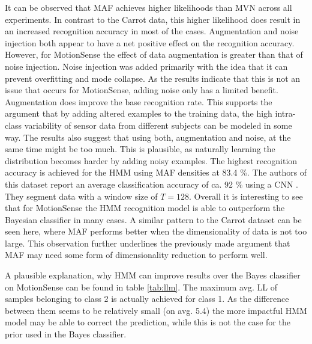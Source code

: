 \documentclass[11pt,titlepage,oneside,openany]{book}
\begin{document}
\noindent It can be observed that MAF achieves higher likelihoods than MVN across all experiments. In contrast to the Carrot data, this higher likelihood does result in an increased recognition accuracy in most of the cases. Augmentation and noise injection both appear to have a net positive effect on the recognition accuracy. However, for MotionSense the effect of data augmentation is greater than that of noise injection. Noise injection was added primarily with the idea that it can prevent overfitting and mode collapse. As the results indicate that this is not an issue that occurs for MotionSense, adding noise only has a limited benefit. Augmentation does improve the base recognition rate. This supports the argument that by adding altered examples to the training data, the high intra-class variability of sensor data from different subjects can be modeled in some way. The results also suggest that using both, augmentation and noise, at the same time might be too much. This is plausible, as naturally learning the distribution becomes harder by adding noisy examples. The highest recognition accuracy is achieved for the HMM using MAF densities at 83.4 \%. The authors of this dataset report an average classification accuracy of ca. 92 \% using a CNN \cite{malekzadeh_mobile_2019}. They segment data with a window size of $T=128$. Overall it is interesting to see that for MotionSense the HMM recognition model is able to outperform the Bayesian classifier in many cases. A similar pattern to the Carrot dataset can be seen here, where MAF performs better when the dimensionality of data is not too large. This observation further underlines the previously made argument that MAF may need some form of dimensionality reduction to perform well.

A plausible explanation, why HMM can improve results over the Bayes classifier on MotionSense can be found in table \ref{tab:llm}. The maximum avg. LL of samples belonging to class 2 is actually achieved for class 1. As the difference between them seems to be relatively small (on avg. 5.4) the more impactful HMM model may be able to correct the prediction, while this is not the case for the prior used in the Bayes classifier.
\end{document}

